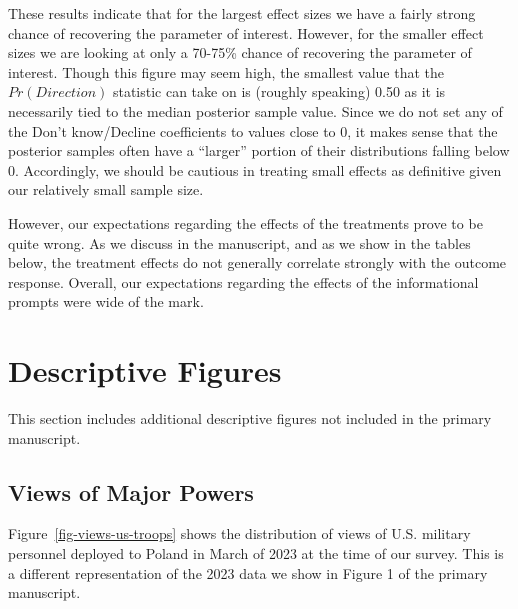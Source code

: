 \documentclass[
  10,
  letterpaper,
  DIV=11,
  numbers=noendperiod]{scrartcl}
\begin{document}
These results indicate that for the largest effect sizes we have a
fairly strong chance of recovering the parameter of interest. However,
for the smaller effect sizes we are looking at only a 70-75\% chance of
recovering the parameter of interest. Though this figure may seem high,
the smallest value that the \(Pr(Direction)\) statistic can take on is
(roughly speaking) 0.50 as it is necessarily tied to the median
posterior sample value. Since we do not set any of the Don't
know/Decline coefficients to values close to 0, it makes sense that the
posterior samples often have a ``larger'' portion of their distributions
falling below 0. Accordingly, we should be cautious in treating small
effects as definitive given our relatively small sample size.

However, our expectations regarding the effects of the treatments prove
to be quite wrong. As we discuss in the manuscript, and as we show in
the tables below, the treatment effects do not generally correlate
strongly with the outcome response. Overall, our expectations regarding
the effects of the informational prompts were wide of the mark.

\hypertarget{descriptive-figures}{%
\section{Descriptive Figures}\label{descriptive-figures}}

This section includes additional descriptive figures not included in the
primary manuscript.

\hypertarget{views-of-major-powers}{%
\subsection{Views of Major Powers}\label{views-of-major-powers}}

Figure~\ref{fig-views-us-troops} shows the distribution of views of U.S.
military personnel deployed to Poland in March of 2023 at the time of
our survey. This is a different representation of the 2023 data we show
in Figure 1 of the primary manuscript.
\end{document}
